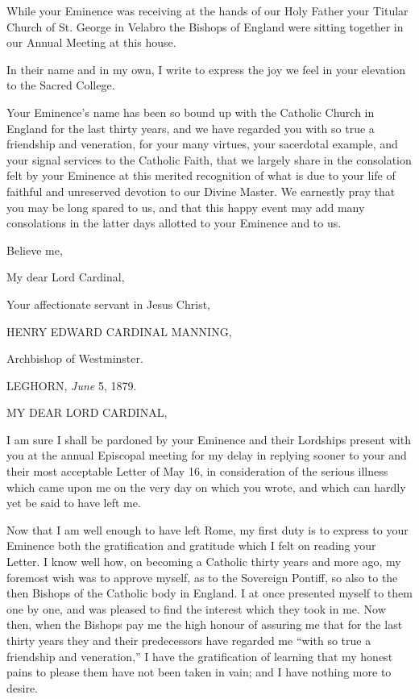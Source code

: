 While your Eminence was receiving at the hands of our Holy Father your
Titular Church of St. George in Velabro the Bishops of England were
sitting together in our Annual Meeting at this house.

In their name and in my own, I write to express the joy we feel in
your elevation to the Sacred College.

Your Eminence's name has been so bound up with the Catholic Church
in England for the last thirty years, and we have regarded you with so
true a friendship and veneration, for your many virtues, your
sacerdotal example, and your signal services to the Catholic Faith,
that we largely share in the consolation felt by your Eminence at this
merited recognition of what is due to your life of faithful and
unreserved devotion to our Divine Master. We earnestly pray that you
may be long spared to us, and that this happy event may add many
consolations in the latter days allotted to your Eminence and to us.

Believe me,

My dear Lord Cardinal,

Your affectionate servant in Jesus Christ,

HENRY EDWARD CARDINAL
MANNING,

Archbishop of Westminster.


LEGHORN, \emph{June} 5, 1879.

MY DEAR LORD
CARDINAL,

I am sure I shall be pardoned by your Eminence and their Lordships
present with you at the annual Episcopal meeting for my delay in
replying sooner to your and their most acceptable Letter of May 16, in
consideration of the serious illness which came upon me on the very
day on which you wrote, and which can hardly yet be said to have left
me.

Now that I am well enough to have left Rome, my first duty is to
express to your Eminence both the gratification and gratitude which I
felt on reading your Letter. I know well how, on becoming a Catholic
thirty years and more ago, my foremost wish was to approve
myself, as to the Sovereign Pontiff, so also to the then Bishops of
the Catholic body in England. I at once presented myself to them one
by one, and was pleased to find the interest which they took in me.
Now then, when the Bishops pay me the high honour of assuring me that
for the last thirty years they and their predecessors have regarded me
``with so true a friendship and veneration,'' I have the
gratification of learning that my honest pains to please them have not
been taken in vain; and I have nothing more to desire.

